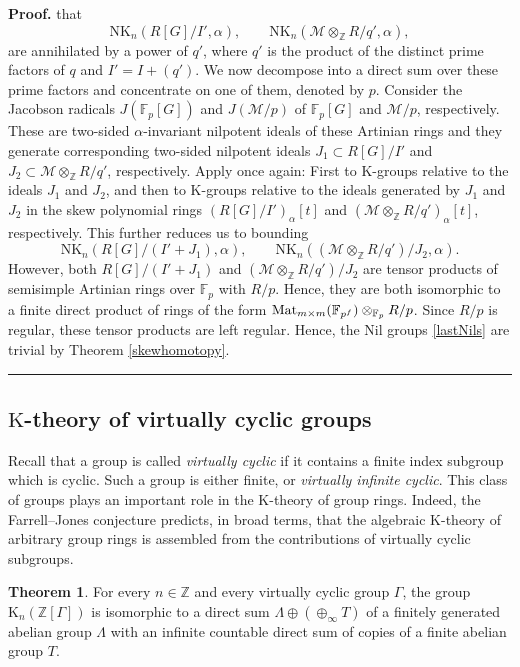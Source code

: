 \documentclass[reqno,11pt,letterpaper]{amsart}
\theoremstyle{plain}
\numberwithin{equation}{subsection}
\newtheorem{theorem}[equation]{Theorem}
\theoremstyle{remark}
\theoremstyle{plain}
\theoremstyle{definition}\newtheorem*{notation}{Notation}
\newcommand{\M}{{\mathcal M}}
\newtheorem{theorem}{Theorem}
\newenvironment{proof}[1][Proof]{\noindent\textbf{#1.} }{\ \rule{0.5em}{0.5em}}
\newcommand{\RK}{\mathrm{K}}
\newcommand{\RNK}{\mathrm{NK}}
\newcommand{\BZ}{\mathbb{Z}}
\newcommand{\BF}{{\mathbb F}}
\begin{document}
\begin{proof}
that  
\[
\RNK_{n}(R[G]/I', \alpha), \qquad \RNK_{n }(\M\otimes_\BZ R/q', \alpha),
\]
are annihilated
by a power of $q'$, where $q'$ is the product of the distinct prime factors of $q$ and $I'=I+(q')$. We now decompose into a direct sum over these prime factors
and concentrate on one of them, denoted by $p$. Consider the Jacobson radicals $J(\BF_p[G])$ and $J(\M/p)$ 
of $\BF_p[G]$ and $\M/p$, respectively. These are two-sided $\alpha$-invariant nilpotent ideals of these Artinian rings and they generate
corresponding two-sided nilpotent ideals $J_1\subset R[G]/I'$ and $J_2\subset \M\otimes_\BZ R/q'$, respectively.
Apply \cite[Thm. A]{GH2} once again: First to  $\RK$-groups relative to the ideals $J_1$ and $J_2$, and then to $\RK$-groups relative to the ideals generated by $J_1$ and $J_2$ in the 
skew polynomial rings $(R[G]/I')_\alpha[t]$ and $(\M\otimes_\BZ R/q')_\alpha[t]$, respectively. This further reduces us to bounding
\begin{equation}\label{lastNils}
\RNK_{n}(R[G]/(I'+J_1), \alpha), \qquad \RNK_{n }((\M\otimes_\BZ R/q')/J_2, \alpha).
\end{equation}
However, both $R[G]/(I'+J_1)$ and $(\M\otimes_\BZ R/q')/J_2$ are  tensor products of semisimple Artinian rings over $\BF_p$
with $R/p$. Hence, they are both isomorphic to a finite direct product of rings of the form ${\rm Mat}_{m\times m}({\BF}_{p^f})\otimes_{\BF_p}R/p$.
Since $R/p$ is regular, these tensor products are left regular. Hence, the Nil groups \eqref{lastNils} are trivial by Theorem \ref{skewhomotopy}.
\end{proof}
\smallskip

\subsection{$\RK$-theory of virtually cyclic groups}
Recall that a group is called \emph{virtually  cyclic} if it contains a finite index subgroup which is cyclic. Such a group is either finite, or 
\emph{virtually  infinite cyclic}.
This class of groups plays an important role in the $\RK$-theory of group rings. 
Indeed, the Farrell–Jones conjecture predicts, in broad terms, that the algebraic $\RK$-theory of arbitrary group rings is assembled from the contributions of virtually cyclic subgroups.
 

 

\begin{theorem}\label{cor2_appB}
For every $n\in \BZ$ and every virtually   cyclic group $\Gamma$, the group $\RK_n(\BZ[\Gamma])$ is isomorphic to a direct sum 
$
\Lambda\oplus (\oplus_\infty T)
$
of a finitely generated abelian group $\Lambda$
with an infinite countable direct sum  of copies of a finite abelian group $T$.
\end{theorem}
\end{document}
